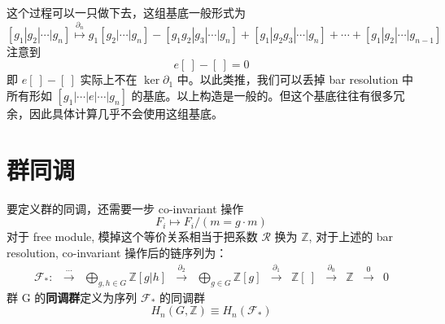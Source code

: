 \documentclass[UTF8]{ctexart}
\begin{document}
这个过程可以一只做下去，这组基底一般形式为
\begin{equation}
\left[g_{1}|g_{2}|\cdots|g_{n}\right]\stackrel{\partial_{n}}{\longmapsto}g_{1}\left[g_{2}|\cdots|g_{n}\right]-\left[g_{1}g_{2}|g_{3}|\cdots|g_{n}\right]+\left[g_{1}|g_{2}g_{3}|\cdots|g_{n}\right]+\cdots+\left[g_{1}|g_{2}|\cdots|g_{n-1}\right]
\end{equation}
注意到
\begin{equation}
e\left[\ \right]-\left[\ \right]=0
\end{equation}
即 $e\left[\ \right]-\left[\ \right]$ 实际上不在 $\ker\partial_{1}$ 中。以此类推，我们可以丢掉
bar resolution 中所有形如 $\left[g_{1}|\cdots|e|\cdots|g_{n}\right]$ 的基底。以上构造是一般的。但这个基底往往有很多冗余，因此具体计算几乎不会使用这组基底。

\section*{群同调}
\noindent
要定义群的同调，还需要一步 co-invariant 操作
\begin{equation}
F_{i}\mapsto F_{i}/\left(m=g\cdot m\right)
\end{equation}
对于 free module, 模掉这个等价关系相当于把系数 $\mathcal{R}$ 换为 $\mathbb{Z}$, 对于上述的
bar resolution, co-invariant 操作后的链序列为：
\begin{equation}
\begin{array}{ccccccccccc}
\mathcal{F}_{*}: & \stackrel{\cdots}{\longrightarrow} & {\displaystyle \bigoplus_{g,h\in G}\mathbb{Z}\left[\left.g\right|h\right]} & \stackrel{\partial_{2}}{\longrightarrow} & {\displaystyle \bigoplus_{g\in G}\mathbb{Z}\left[g\right]} & \stackrel{\partial_{1}}{\longrightarrow} & \mathbb{Z}\left[\ \right] & \stackrel{\partial_{0}}{\longrightarrow} & \mathbb{Z} & \stackrel{0}{\longrightarrow} & 0\end{array}
\end{equation}
群 G 的\textbf{同调群}定义为序列 $\mathcal{F}_{*}$ 的同调群
\begin{equation}
H_{n}\left(G,\mathbb{Z}\right)\equiv H_{n}\left(\mathcal{F}_{*}\right)
\end{equation}
\end{document}
